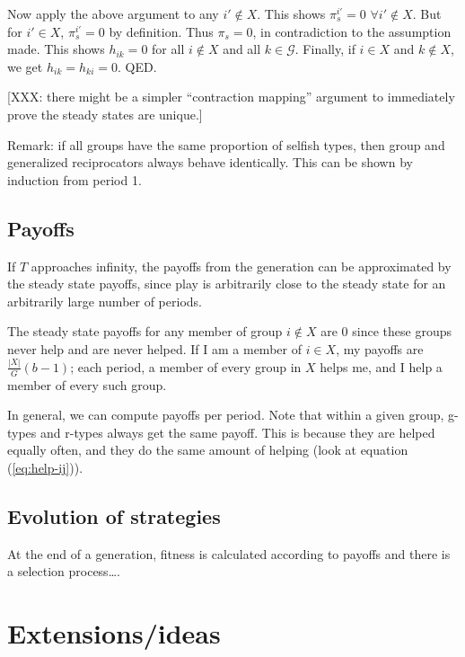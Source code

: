 \documentclass[
]{article}
\begin{document}
Now apply the above argument to any \(i' \notin X\). This shows
\(\pi^{i'}_s = 0\) \(\forall i' \notin X\). But for \(i' \in X\),
\(\pi^{i'}_s = 0\) by definition. Thus \(\pi_s = 0\), in contradiction
to the assumption made. This shows \(h_{ik} = 0\) for all \(i \notin X\)
and all \(k \in \mathcal{G}\). Finally, if \(i \in X\) and
\(k \notin X\), we get \(h_{ik} = h_{ki}=0\). QED.

{[}XXX: there might be a simpler ``contraction mapping'' argument to
immediately prove the steady states are unique.{]}

Remark: if all groups have the same proportion of selfish types, then
group and generalized reciprocators always behave identically. This can
be shown by induction from period 1.

\hypertarget{payoffs}{%
\subsection{Payoffs}\label{payoffs}}

If \(T\) approaches infinity, the payoffs from the generation can be
approximated by the steady state payoffs, since play is arbitrarily
close to the steady state for an arbitrarily large number of periods.

The steady state payoffs for any member of group \(i \notin X\) are 0
since these groups never help and are never helped. If I am a member of
\(i \in X\), my payoffs are \(\frac{|X|}{G}(b - 1)\); each period, a
member of every group in \(X\) helps me, and I help a member of every
such group.

In general, we can compute payoffs per period. Note that within a given
group, g-types and r-types always get the same payoff. This is because
they are helped equally often, and they do the same amount of helping
(look at equation (\ref{eq:help-ij})).

\hypertarget{evolution-of-strategies}{%
\subsection{Evolution of strategies}\label{evolution-of-strategies}}

At the end of a generation, fitness is calculated according to payoffs
and there is a selection process\ldots.

\hypertarget{extensionsideas}{%
\section{Extensions/ideas}\label{extensionsideas}}
\end{document}
